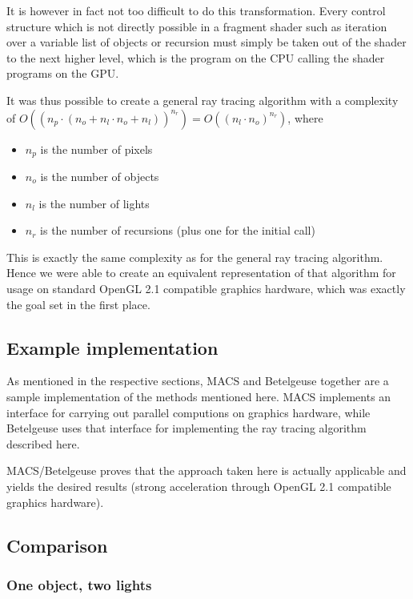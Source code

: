 \documentclass[english,fleqn,10pt,twocolumn]{article}
\begin{document}
It is however in fact not too difficult to do this transformation. Every control structure which is not directly possible in a fragment shader such as iteration over a variable list of objects or recursion must simply be taken out of the
shader to the next higher level, which is the program on the CPU calling the shader programs on the GPU.

It was thus possible to create a general ray tracing algorithm with a complexity of $O((n_p \cdot (n_o + n_l \cdot n_o + n_l))^{n_r}) = O((n_l \cdot n_o)^{n_r})$, where
\begin{itemize}
    \item $n_p$ is the number of pixels
    \item $n_o$ is the number of objects
    \item $n_l$ is the number of lights
    \item $n_r$ is the number of recursions (plus one for the initial call)
\end{itemize}

This is exactly the same complexity as for the general ray tracing algorithm. Hence we were able to create an equivalent representation of that algorithm for usage on standard OpenGL 2.1 compatible graphics hardware, which was exactly
the goal set in the first place.

\subsection{Example implementation}

As mentioned in the respective sections, MACS and Betelgeuse together are a sample implementation of the methods mentioned here. MACS implements an interface for carrying out parallel computions on graphics hardware, while Betelgeuse
uses that interface for implementing the ray tracing algorithm described here.

MACS/Betelgeuse proves that the approach taken here is actually applicable and yields the desired results (strong acceleration through OpenGL 2.1 compatible graphics hardware).

\subsection{Comparison}

\subsubsection{One object, two lights}
\end{document}
